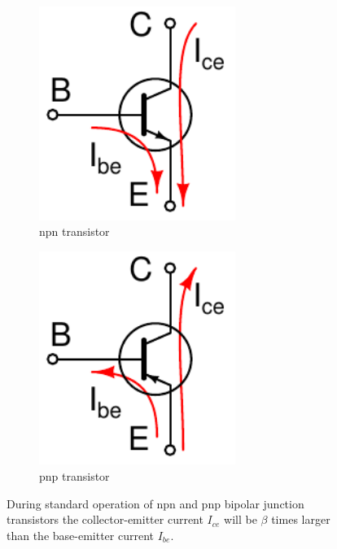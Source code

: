 \documentclass{article}
\begin{document}
\begin{figure}
\begin{center}
\begin{subfigure}{0.4\textwidth}
\begin{center}
\includegraphics[width=0.7\textwidth]{pics/npn_transistor_with_currents}
\end{center}
\caption{npn transistor}
\end{subfigure}
\begin{subfigure}{0.4\textwidth}
\begin{center}
\includegraphics[width=0.7\textwidth]{pics/pnp_transistor_with_currents}
\end{center}
\caption{pnp transistor}
\end{subfigure}
\end{center}
\caption{During standard operation of npn and pnp bipolar junction transistors the collector-emitter current $I_{ce}$ will be $\beta$ times larger than the base-emitter current $I_{be}$.}
\label{fig:transistors_with_currents}
\end{figure}
\end{document}

